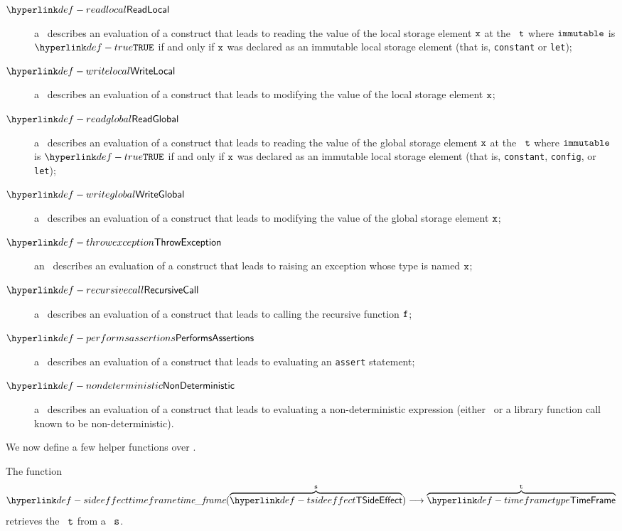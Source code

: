 \begin{description}
    \item[$\ReadLocal$] a \ReadLocalTerm\ describes an evaluation of a construct that leads to reading the value of the local storage element
        $\texttt{x}$ at the \timeframeterm\ $\texttt{t}$ where $\texttt{immutable}$ is $\True$ if and only if $\texttt{x}$
        was declared as an immutable local storage element (that is, \texttt{constant} or \texttt{let});
    \hypertarget{def-writelocalterm}{}
    \item[$\WriteLocal$] a \WriteLocalTerm\ describes an evaluation of a construct that leads to modifying the value of the local storage element
        $\texttt{x}$;
    \hypertarget{def-readglobalterm}{}
    \item[$\ReadGlobal$] a \ReadGlobalTerm\ describes an evaluation of a construct that leads to reading the value of the global storage element
        $\texttt{x}$ at the \timeframeterm\ $\texttt{t}$ where $\texttt{immutable}$ is $\True$ if and only if $\texttt{x}$
        was declared as an immutable local storage element (that is, \texttt{constant}, \texttt{config}, or \texttt{let});
    \hypertarget{def-writeglobalterm}{}
    \item[$\WriteGlobal$] a \WriteGlobalTerm\ describes an evaluation of a construct that leads to modifying the value of the global storage element
        $\texttt{x}$;
    \hypertarget{def-throwexceptionterm}{}
    \item[$\ThrowException$] an \ThrowExceptionTerm\ describes an evaluation of a construct that leads to raising an exception whose type
        is named $\texttt{x}$;
    \hypertarget{def-recursivecallterm}{}
    \item[$\RecursiveCall$] a \RecursiveCallTerm\ describes an evaluation of a construct that leads to calling the recursive function $\texttt{f}$;
    \hypertarget{def-performsassertionsterm}{}
    \item[$\PerformsAssertions$] a \PerformsAssertionsTerm\ describes an evaluation of a construct that leads to evaluating an \texttt{assert} statement;
    \hypertarget{def-nondeterministicterm}{}
    \item[$\NonDeterministic$] a \NonDeterministicTerm\ describes an evaluation of a construct that leads to evaluating a non-deterministic
        expression (either \ARBITRARY\ or a library function call known to be non-deterministic).
\end{description}

We now define a few helper functions over \timeframesterm.

\hypertarget{def-sideeffecttimeframe}{}
The function
\[
    \timeframe(\overname{\TSideEffect}{\vs}) \aslto \overname{\TTimeFrame}{\vt}
\]
retrieves the \timeframeterm\ $\texttt{t}$ from a \sideeffectdescriptorterm\ $\texttt{s}$.

